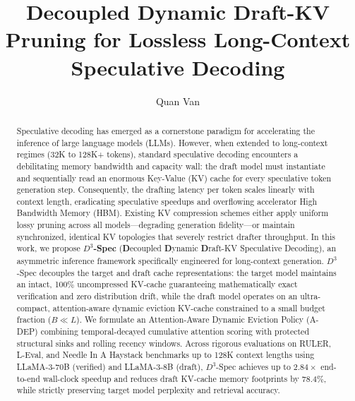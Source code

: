 \documentclass[runningheads]{llncs}
\begin{document}
\title{Decoupled Dynamic Draft-KV Pruning for Lossless Long-Context Speculative Decoding}

\author{Quan Van}

\maketitle

\begin{abstract}
Speculative decoding has emerged as a cornerstone paradigm for accelerating the inference of large language models (LLMs). However, when extended to long-context regimes (32K to 128K+ tokens), standard speculative decoding encounters a debilitating memory bandwidth and capacity wall: the draft model must instantiate and sequentially read an enormous Key-Value (KV) cache for every speculative token generation step. Consequently, the drafting latency per token scales linearly with context length, eradicating speculative speedups and overflowing accelerator High Bandwidth Memory (HBM). Existing KV compression schemes either apply uniform lossy pruning across all models---degrading generation fidelity---or maintain synchronized, identical KV topologies that severely restrict drafter throughput. 
In this work, we propose \textbf{$D^3$-Spec} (\textbf{D}ecoupled \textbf{D}ynamic \textbf{D}raft-KV Speculative Decoding), an asymmetric inference framework specifically engineered for long-context generation. $D^3$-Spec decouples the target and draft cache representations: the target model maintains an intact, 100\% uncompressed KV-cache guaranteeing mathematically exact verification and zero distribution drift, while the draft model operates on an ultra-compact, attention-aware dynamic eviction KV-cache constrained to a small budget fraction ($B \ll L$). We formulate an Attention-Aware Dynamic Eviction Policy (A-DEP) combining temporal-decayed cumulative attention scoring with protected structural sinks and rolling recency windows. Across rigorous evaluations on RULER, L-Eval, and Needle In A Haystack benchmarks up to 128K context lengths using LLaMA-3-70B (verified) and LLaMA-3-8B (draft), $D^3$-Spec achieves up to $2.84\times$ end-to-end wall-clock speedup and reduces draft KV-cache memory footprints by $78.4\%$, while strictly preserving target model perplexity and retrieval accuracy.
\end{abstract}
\end{document}
